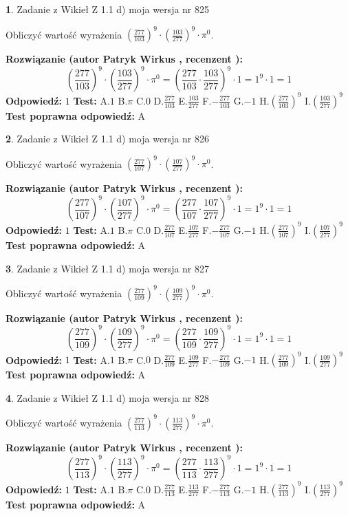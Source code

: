 \documentclass[12pt, a4paper]{article}
\theoremstyle{definition} %
\newtheorem{zad}{}
\newcommand{\zadStart}[1]{\begin{zad}#1\newline}
\newcommand{\zadStop}{\end{zad}}
\newcommand{\rozwStart}[2]{\noindent \textbf{Rozwiązanie (autor #1 , recenzent #2): }\newline}
\newcommand{\rozwStop}{\newline}
\newcommand{\odpStart}{\noindent \textbf{Odpowiedź:}\newline}
\newcommand{\odpStop}{\newline}
\newcommand{\testStart}{\noindent \textbf{Test:}\newline}
\newcommand{\testStop}{\newline}
\newcommand{\kluczStart}{\noindent \textbf{Test poprawna odpowiedź:}\newline}
\newcommand{\kluczStop}{\newline}
\begin{document}
\zadStart{Zadanie z Wikieł Z 1.1 d) moja wersja nr 825}

Obliczyć wartość wyrażenia $(\frac{277}{103})^{9} \cdot (\frac{103}{277})^{9} \cdot \pi^{0}$.
\zadStop
\rozwStart{Patryk Wirkus}{}
$$(\frac{277}{103})^{9} \cdot (\frac{103}{277})^{9} \cdot \pi^{0} = (\frac{277}{103} \cdot \frac{103}{277})^{9} \cdot 1 = 1^{9} \cdot 1 = 1$$
\rozwStop
\odpStart
$1$
\odpStop
\testStart
A.$1$ B.$\pi$ C.$0$ D.$\frac{277}{103}$ E.$\frac{103}{277}$
F.$-\frac{277}{103}$ G.$-1$
H.$(\frac{277}{103})^{9}$
I.$(\frac{103}{277})^{9}$
\testStop
\kluczStart
A
\kluczStop



\zadStart{Zadanie z Wikieł Z 1.1 d) moja wersja nr 826}

Obliczyć wartość wyrażenia $(\frac{277}{107})^{9} \cdot (\frac{107}{277})^{9} \cdot \pi^{0}$.
\zadStop
\rozwStart{Patryk Wirkus}{}
$$(\frac{277}{107})^{9} \cdot (\frac{107}{277})^{9} \cdot \pi^{0} = (\frac{277}{107} \cdot \frac{107}{277})^{9} \cdot 1 = 1^{9} \cdot 1 = 1$$
\rozwStop
\odpStart
$1$
\odpStop
\testStart
A.$1$ B.$\pi$ C.$0$ D.$\frac{277}{107}$ E.$\frac{107}{277}$
F.$-\frac{277}{107}$ G.$-1$
H.$(\frac{277}{107})^{9}$
I.$(\frac{107}{277})^{9}$
\testStop
\kluczStart
A
\kluczStop



\zadStart{Zadanie z Wikieł Z 1.1 d) moja wersja nr 827}

Obliczyć wartość wyrażenia $(\frac{277}{109})^{9} \cdot (\frac{109}{277})^{9} \cdot \pi^{0}$.
\zadStop
\rozwStart{Patryk Wirkus}{}
$$(\frac{277}{109})^{9} \cdot (\frac{109}{277})^{9} \cdot \pi^{0} = (\frac{277}{109} \cdot \frac{109}{277})^{9} \cdot 1 = 1^{9} \cdot 1 = 1$$
\rozwStop
\odpStart
$1$
\odpStop
\testStart
A.$1$ B.$\pi$ C.$0$ D.$\frac{277}{109}$ E.$\frac{109}{277}$
F.$-\frac{277}{109}$ G.$-1$
H.$(\frac{277}{109})^{9}$
I.$(\frac{109}{277})^{9}$
\testStop
\kluczStart
A
\kluczStop



\zadStart{Zadanie z Wikieł Z 1.1 d) moja wersja nr 828}

Obliczyć wartość wyrażenia $(\frac{277}{113})^{9} \cdot (\frac{113}{277})^{9} \cdot \pi^{0}$.
\zadStop
\rozwStart{Patryk Wirkus}{}
$$(\frac{277}{113})^{9} \cdot (\frac{113}{277})^{9} \cdot \pi^{0} = (\frac{277}{113} \cdot \frac{113}{277})^{9} \cdot 1 = 1^{9} \cdot 1 = 1$$
\rozwStop
\odpStart
$1$
\odpStop
\testStart
A.$1$ B.$\pi$ C.$0$ D.$\frac{277}{113}$ E.$\frac{113}{277}$
F.$-\frac{277}{113}$ G.$-1$
H.$(\frac{277}{113})^{9}$
I.$(\frac{113}{277})^{9}$
\testStop
\kluczStart
A
\kluczStop
\end{document}
